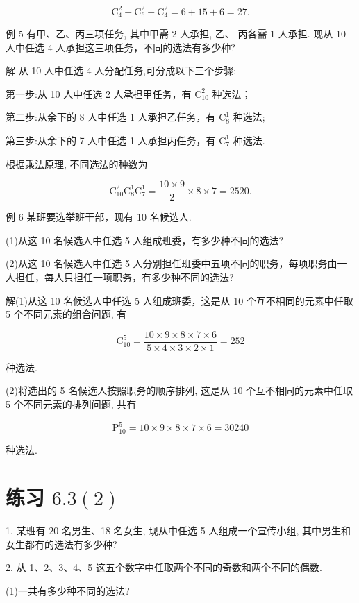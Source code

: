 \documentclass[10pt]{article}
\begin{document}
\[
{\mathrm{C}}_{4}^{2} + {\mathrm{C}}_{6}^{2} + {\mathrm{C}}_{4}^{2} = 6 + {15} + 6 = {27}.
\]

例 5 有甲、乙、丙三项任务, 其中甲需 2 人承担, 乙、 丙各需 1 人承担. 现从 10 人中任选 4 人承担这三项任务，不同的选法有多少种?

解 从 10 人中任选 4 人分配任务,可分成以下三个步骤:

第一步:从 10 人中任选 2 人承担甲任务，有 \({\mathrm{C}}_{10}^{2}\) 种选法；

第二步:从余下的 8 人中任选 1 人承担乙任务，有 \({\mathrm{C}}_{8}^{1}\) 种选法;

第三步:从余下的 7 人中任选 1 人承担丙任务，有 \({\mathrm{C}}_{7}^{1}\) 种选法.





根据乘法原理, 不同选法的种数为

\[
{\mathrm{C}}_{10}^{2}{\mathrm{C}}_{8}^{1}{\mathrm{C}}_{7}^{1} = \frac{{10} \times  9}{2} \times  8 \times  7 = {2520}.
\]

例 6 某班要选举班干部，现有 10 名候选人.

(1)从这 10 名候选人中任选 5 人组成班委，有多少种不同的选法?

(2)从这 10 名候选人中任选 5 人分别担任班委中五项不同的职务，每项职务由一人担任，每人只担任一项职务，有多少种不同的选法?

解(1)从这 10 名候选人中任选 5 人组成班委，这是从 10 个互不相同的元素中任取 5 个不同元素的组合问题, 有

\[
{\mathrm{C}}_{10}^{5} = \frac{{10} \times  9 \times  8 \times  7 \times  6}{5 \times  4 \times  3 \times  2 \times  1} = {252}
\]

种选法.

(2)将选出的 5 名候选人按照职务的顺序排列, 这是从 10 个互不相同的元素中任取 5 个不同元素的排列问题, 共有

\[
{\mathrm{P}}_{10}^{5} = {10} \times  9 \times  8 \times  7 \times  6 = {30240}
\]

种选法.

\section*{练习 \({6.3}\left( 2\right)\)}

1. 某班有 20 名男生、18 名女生, 现从中任选 5 人组成一个宣传小组, 其中男生和女生都有的选法有多少种?

2. 从 1、2、3、4、5 这五个数字中任取两个不同的奇数和两个不同的偶数.

(1)一共有多少种不同的选法?
\end{document}
